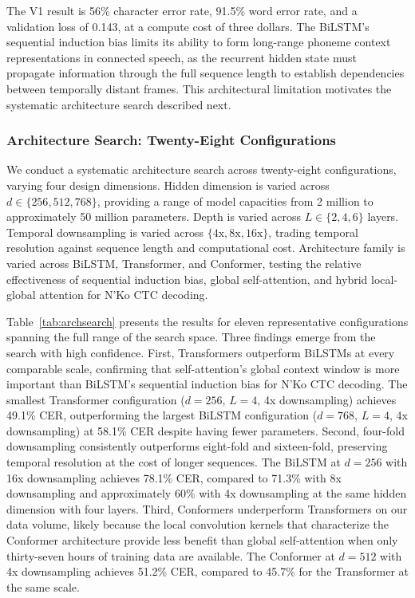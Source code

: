 \documentclass[11pt]{article}
\newcommand{\nko}{N'Ko}
\begin{document}
The V1 result is 56\% character error rate, 91.5\% word error rate, and a validation loss of 0.143, at a compute cost of three dollars. The BiLSTM's sequential induction bias limits its ability to form long-range phoneme context representations in connected speech, as the recurrent hidden state must propagate information through the full sequence length to establish dependencies between temporally distant frames. This architectural limitation motivates the systematic architecture search described next.

\subsubsection{Architecture Search: Twenty-Eight Configurations}

We conduct a systematic architecture search across twenty-eight configurations, varying four design dimensions. Hidden dimension is varied across $d \in \{256, 512, 768\}$, providing a range of model capacities from 2 million to approximately 50 million parameters. Depth is varied across $L \in \{2, 4, 6\}$ layers. Temporal downsampling is varied across $\{4\text{x}, 8\text{x}, 16\text{x}\}$, trading temporal resolution against sequence length and computational cost. Architecture family is varied across BiLSTM, Transformer, and Conformer, testing the relative effectiveness of sequential induction bias, global self-attention, and hybrid local-global attention for \nko{} CTC decoding.

Table~\ref{tab:archsearch} presents the results for eleven representative configurations spanning the full range of the search space. Three findings emerge from the search with high confidence. First, Transformers outperform BiLSTMs at every comparable scale, confirming that self-attention's global context window is more important than BiLSTM's sequential induction bias for \nko{} CTC decoding. The smallest Transformer configuration ($d=256$, $L=4$, 4x downsampling) achieves 49.1\% CER, outperforming the largest BiLSTM configuration ($d=768$, $L=4$, 4x downsampling) at 58.1\% CER despite having fewer parameters. Second, four-fold downsampling consistently outperforms eight-fold and sixteen-fold, preserving temporal resolution at the cost of longer sequences. The BiLSTM at $d=256$ with 16x downsampling achieves 78.1\% CER, compared to 71.3\% with 8x downsampling and approximately 60\% with 4x downsampling at the same hidden dimension with four layers. Third, Conformers underperform Transformers on our data volume, likely because the local convolution kernels that characterize the Conformer architecture provide less benefit than global self-attention when only thirty-seven hours of training data are available. The Conformer at $d=512$ with 4x downsampling achieves 51.2\% CER, compared to 45.7\% for the Transformer at the same scale.
\end{document}
